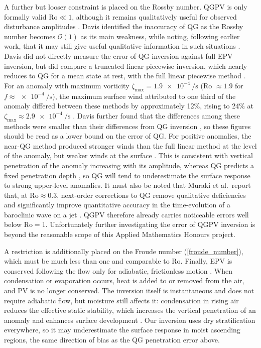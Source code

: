 \documentclass{article}
\begin{document}
A further but looser constraint is placed on the Rossby number.
QGPV is only formally valid $\mathrm{Ro} \ll 1$, although it remains qualitatively useful for observed disturbance amplitudes \cite{HOLTON_chapter6}.
Davis identified the inaccuracy of QG as the Rossby number becomes $\mathcal{O}(1)$ as its main weakness, while noting, following earlier work, that it may still give useful qualitative information in such situations \cite{Davis1992jas}.
Davis did not directly measure the error of QG inversion against full EPV inversion, but did compare a truncated linear piecewise inversion, which nearly reduces to QG for a mean state at rest, with the full linear piecewise method \cite{Davis1992jas}.
For an anomaly with maximum vorticity $\zeta_{\max}  = \qty{1.9e-4}{\per\second}$ (Ro $\approx 1.9$ for $f \approx \qty{e-4}{\per\second}$), the maximum surface wind attributed to one third of the anomaly differed between these methods by approximately 12\%, rising to 24\% at $\zeta_{\max} \approx \qty{2.9e-4}{\per\second}$ \cite{Davis1992jas}.
Davis further found that the differences among these methods were smaller than their differences from QG inversion \cite{Davis1992jas}, so these figures should be read as a lower bound on the error of QG.
For positive anomalies, the near-QG method produced stronger winds than the full linear method at the level of the anomaly, but weaker winds at the surface \cite{Davis1992jas}.
This is consistent with vertical penetration of the anomaly increasing with its amplitude, whereas QG predicts a fixed penetration depth \cite{Davis1992jas}, so QG will tend to underestimate the surface response to strong upper-level anomalies.
It must also be noted that Muraki et al.\ report that, at $\mathrm{Ro} \approx 0.3$, next-order corrections to QG remove qualitative deficiencies and significantly improve quantitative accuracy in the time-evolution of a baroclinic wave on a jet \cite{Muraki1999}.
QGPV therefore already carries noticeable errors well below $\mathrm{Ro} = 1$.
Unfortunately further investigating the error of QGPV inversion is beyond the reasonable scope of this Applied Mathematics Honours project.

A restriction is additionally placed on the Froude number (\cref{froude_number}), which must be much less than one and comparable to $\mathrm{Ro}$.
Finally, EPV is conserved following the flow only for adiabatic, frictionless motion \cite{Hoskins1985}.
When condensation or evaporation occurs, heat is added to or removed from the air, and PV is no longer conserved.
The inversion itself is instantaneous and does not require adiabatic flow, but moisture still affects it: condensation in rising air reduces the effective static stability, which increases the vertical penetration of an anomaly and enhances surface development \cite{Hoskins1985}.
Our inversion uses dry stratification everywhere, so it may underestimate the surface response in moist ascending regions, the same direction of bias as the QG penetration error above.
\end{document}
